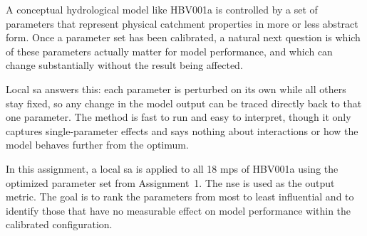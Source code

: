 A conceptual hydrological model like HBV001a is controlled by a set of parameters that represent physical catchment properties in more or less abstract form. Once a parameter set has been calibrated, a natural next question is which of these parameters actually matter for model performance, and which can change substantially without the result being affected.

Local \ac{sa} answers this: each parameter is perturbed on its own while all others stay fixed, so any change in the model output can be traced directly back to that one parameter. The method is fast to run and easy to interpret, though it only captures single-parameter effects and says nothing about interactions or how the model behaves further from the optimum.

In this assignment, a local \ac{sa} is applied to all 18 \acp{mp} of HBV001a using the optimized parameter set from Assignment~1. The \ac{nse} is used as the output metric. The goal is to rank the parameters from most to least influential and to identify those that have no measurable effect on model performance within the calibrated configuration.
